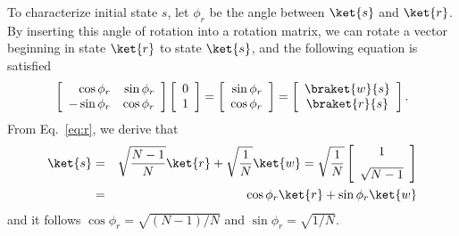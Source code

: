 \documentclass[11pt,oneside,final]{huthesis}%
\begin{document}
To characterize initial state $s$, let $\phi_r$ be the angle between $\ket{s}$ and $\ket{r}$.  By inserting this angle of rotation into a rotation matrix, we can rotate a vector beginning in state $\ket{r}$ to state $\ket{s}$, and the following equation is satisfied
\begin{equation}
	 \left[ \begin{array}{rr}
		\cos \phi_r & \sin \phi_r\\
		- \sin \phi_r&\cos \phi_r \\
	\end{array}\right]\left[ \begin{array}{rr}
	0\\1
	\end{array}\right]=\left[ \begin{array}{rr}
	\sin \phi_r\\\cos \phi_r
	\end{array}\right]=\left[ \begin{array}{cc}
		\braket{w}{s}\\\braket{r}{s}
	\end{array}\right].
	\label{eq:srot}
\end{equation}
From Eq.~\eqref{eq:r}, we derive that 
\begin{eqnarray}
	\ket{s}&=& \sqrt{\frac{N-1}{N}}\ket{r}+\sqrt{\frac{1}{N}}\ket{w}=\sqrt{\frac{1}{N}}\left[ \begin{array}{cc}1	\\[6pt]
\sqrt{N-1}
\end{array}\right]\label{eq:s0}\\
&=& \cos\phi_r\ket{r}+\sin\phi_r\ket{w}
\label{eq:s1}\end{eqnarray} 
and it follows $\cos \phi_r=\sqrt{(N-1)/N}$ and $\sin \phi_r=\sqrt{1/N}$.  
\end{document}
